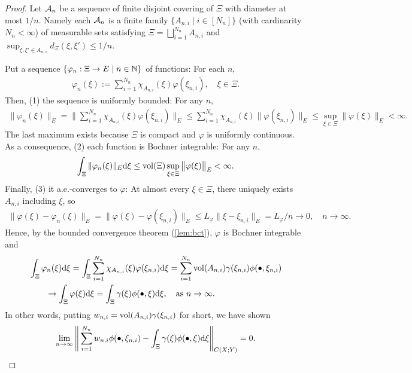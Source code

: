 \begin{proof}
Let $\mathcal{A}_n$ be a sequence of finite disjoint covering of $\Xi$ with diameter at most $1/n$. Namely each $\mathcal{A}_n$ is a finite family $\{A_{n,i} \mid i \in [N_n]\}$ (with cardinarity $N_n < \infty$) of measurable sets satisfying $\Xi = \bigsqcup_{i=1}^{N_n} A_{n,i}$ and $\sup_{\xi,\xi' \in A_{n,i}} d_\Xi(\xi,\xi') \le 1/n$.

Put a sequence $\{\varphi_n : \Xi \to E \mid n \in \mathbb{N}\}$ of functions: For each $n$,
\begin{align*}
\varphi_n(\xi) := \sum_{i=1}^{N_n} \chi_{A_{n,i}}(\xi) \varphi(\xi_{n,i}), \quad \xi \in \Xi.
\end{align*}
Then, 
(1) the sequence is uniformly bounded: For any $n$,
\begin{align*}
    \| \varphi_n(\xi) \|_E
    = \Bigg\| \sum_{i=1}^{N_n} \chi_{A_{n,i}}(\xi) \varphi(\xi_{n,i}) \Bigg\|_E
    \le \sum_{i=1}^{N_n} \chi_{A_{n,i}}(\xi) \big\| \varphi(\xi_{n,i}) \big\|_E
    \le \sup_{\xi \in \Xi} \| \varphi(\xi) \|_E < \infty.
\end{align*}
The last maximum exists because $\Xi$ is compact and $\varphi$ is uniformly continuous.
As a consequence, (2) each function is Bochner integrable: For any $n$,
\begin{align*}
    \int_\Xi \| \varphi_n(\xi) \|_E \mathrm{d} \xi
    \le
    \operatorname{vol}(\Xi) \sup_{\xi \in \Xi} \big\| \varphi(\xi) \big\|_E < \infty.
\end{align*}
Finally, (3) it a.e.-converges to $\varphi$: At almost every $\xi \in \Xi$, there uniquely exists $A_{n,i}$ including $\xi$, so
\begin{align*}
    \|\varphi(\xi) - \varphi_n(\xi)\|_E
    = 
    \|\varphi(\xi) - \varphi(\xi_{n,i})\|_E
    \le 
    L_\varphi \|\xi - \xi_{n,i}\|_E
    = L_\varphi/n \to 0, \quad n \to \infty.
\end{align*}
Hence, by the bounded convergence theorem (\cref{lem:bct}), $\varphi$ is Bochner integrable and 
\begin{align*}
    &\int_\Xi \varphi_n(\xi) \mathrm{d}\xi
    = \int_\Xi \sum_{i=1}^{N_n} \chi_{A_{n,i}}(\xi) \varphi(\xi_{n,i}) \mathrm{d}\xi
    = \sum_{i=1}^{N_n} \operatorname{vol}(A_{n,i}) \gamma(\xi_{n,i}) \phi(\bullet,\xi_{n,i})\\
    &\qquad \to \int_\Xi \varphi(\xi) \mathrm{d} \xi = \int_\Xi \gamma(\xi) \phi(\bullet,\xi)\mathrm{d}\xi, \quad \mbox{as } n \to \infty.
\end{align*}
In other words, putting $w_{n,i} = \operatorname{vol}(A_{n,i}) \gamma(\xi_{n,i})$ for short, we have shown
\begin{align*}
    \lim_{n \to \infty} \Bigg\| \sum_{i=1}^{N_n} w_{n,i} \phi(\bullet,\xi_{n,i}) - \int_\Xi \gamma(\xi) \phi(\bullet,\xi)\dd\xi \Bigg\|_{C(X;Y)} = 0. %
    \mbox{\qedhere}
\end{align*}
\end{proof}

